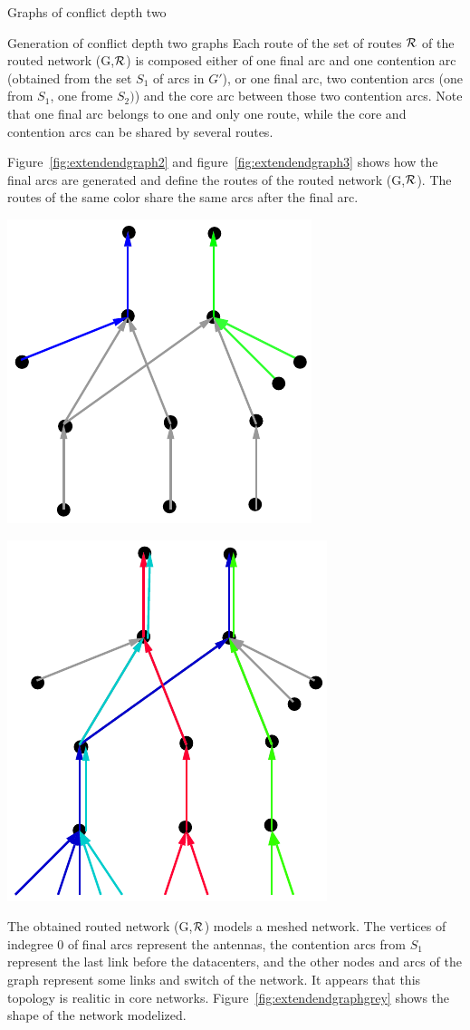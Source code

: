 \documentclass[10pt]{article}
\begin{document}
\begin{section}{Graphs of conflict depth two}
\begin{subsection}{Generation of conflict depth two graphs}
Each route of the set of routes $\cal{R}$ of the routed network (G,$\cal{R}$) is composed either of one final arc and one contention arc (obtained from the set $S_1$ of arcs in $G'$), or one final arc, two contention arcs (one from $S_1$, one frome $S_2)$) and the core arc between those two contention arcs.
Note that one final arc belongs to one and only one route, while the core and contention arcs can be shared by several routes. 

Figure~\ref{fig:extendendgraph2} and figure~\ref{fig:extendendgraph3} shows how the final arcs are generated and define the routes of the routed network (G,$\cal{R}$). The routes of the same color share the same arcs after the final arc.

\begin{minipage}{.5\linewidth}

\begin{center}
\includegraphics[width=0.4\linewidth]{extendendgraph2}
\label{fig:extendendgraph2}
\end{center}

\end{minipage}
\begin{minipage}{.5\linewidth}
\begin{center}
\includegraphics[width=0.4\linewidth]{extendendgraph3}
\label{fig:extendendgraph3}
\end{center}
\end{minipage}
  The obtained routed network (G,$\cal{R}$) models a meshed network. The vertices of indegree $0$ of final arcs represent the antennas, the contention arcs from $S_1$ represent the last link before the datacenters, and the other nodes and arcs of the graph represent some links and switch of the network. It appears that this topology is realitic in core networks.
  Figure~\ref{fig:extendendgraphgrey} shows the shape of the network modelized.


\end{subsection}
\end{section}
\end{document}
